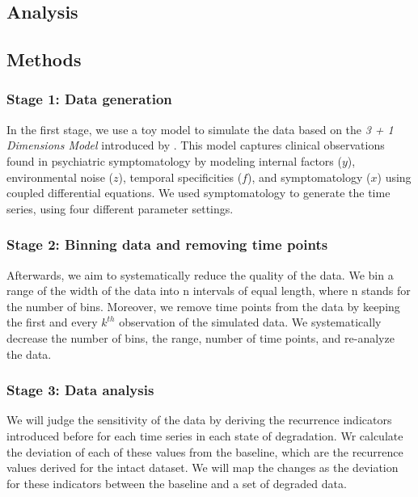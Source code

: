 \documentclass[utf8]{FrontiersinVancouver}
\begin{document}
\subsection{Analysis}

\subsection{Methods}

\subsubsection{Stage 1: Data generation}

In the first stage, we use a toy model to simulate the data based on the \textit{3 + 1 Dimensions Model} introduced by \citep{gauldDynamicalSystemsComputational2023}. This model captures clinical observations found in psychiatric symptomatology by modeling internal factors ($y$), environmental noise ($z$), temporal specificities ($f$), and symptomatology ($x$) using coupled differential equations. We used symptomatology to generate the time series, using four different parameter settings.

\subsubsection{Stage 2: Binning data and removing time points}

Afterwards, we aim to systematically reduce the quality of the data. We bin a range of the width of the data into n intervals of equal length, where n stands for the number of bins. Moreover, we remove time points from the data by keeping the first and every $k^{th}$ observation of the simulated data. We systematically decrease the number of bins, the range, number of time points, and re-analyze the data.

\subsubsection{Stage 3: Data analysis}
We will judge the sensitivity of the data by deriving the recurrence indicators introduced before for each time series in each state of degradation. Wr calculate the deviation of each of these values from the baseline, which are the recurrence values derived for the intact dataset. We will map the changes as the deviation for these indicators between the baseline and a set of degraded data.

\end{document}
